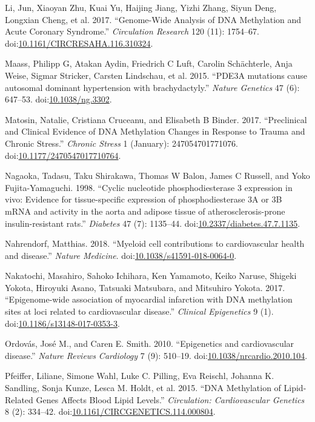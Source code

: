 \documentclass[]{article}
\theoremstyle{definition}
\theoremstyle{definition}
\theoremstyle{definition}
\theoremstyle{remark}
\begin{document}
Li, Jun, Xiaoyan Zhu, Kuai Yu, Haijing Jiang, Yizhi Zhang, Siyun Deng,
Longxian Cheng, et al. 2017. ``Genome-Wide Analysis of DNA Methylation
and Acute Coronary Syndrome.'' \emph{Circulation Research} 120 (11):
1754--67.
doi:\href{http://dx.doi.org/10.1161/CIRCRESAHA.116.310324}{10.1161/CIRCRESAHA.116.310324}.

Maass, Philipp G, Atakan Aydin, Friedrich C Luft, Carolin Sch{ä}chterle,
Anja Weise, Sigmar Stricker, Carsten Lindschau, et al. 2015. ``PDE3A
mutations cause autosomal dominant hypertension with brachydactyly.''
\emph{Nature Genetics} 47 (6): 647--53.
doi:\href{http://dx.doi.org/10.1038/ng.3302}{10.1038/ng.3302}.

Matosin, Natalie, Cristiana Cruceanu, and Elisabeth B Binder. 2017.
``Preclinical and Clinical Evidence of DNA Methylation Changes in
Response to Trauma and Chronic Stress.'' \emph{Chronic Stress} 1
(January): 247054701771076.
doi:\href{http://dx.doi.org/10.1177/2470547017710764}{10.1177/2470547017710764}.

Nagaoka, Tadasu, Taku Shirakawa, Thomas W Balon, James C Russell, and
Yoko Fujita-Yamaguchi. 1998. ``Cyclic nucleotide phosphodiesterase 3
expression in vivo: Evidence for tissue-specific expression of
phosphodiesterase 3A or 3B mRNA and activity in the aorta and adipose
tissue of atherosclerosis-prone insulin-resistant rats.''
\emph{Diabetes} 47 (7): 1135--44.
doi:\href{http://dx.doi.org/10.2337/diabetes.47.7.1135}{10.2337/diabetes.47.7.1135}.

Nahrendorf, Matthias. 2018. ``Myeloid cell contributions to
cardiovascular health and disease.'' \emph{Nature Medicine}.
doi:\href{http://dx.doi.org/10.1038/s41591-018-0064-0}{10.1038/s41591-018-0064-0}.

Nakatochi, Masahiro, Sahoko Ichihara, Ken Yamamoto, Keiko Naruse,
Shigeki Yokota, Hiroyuki Asano, Tatsuaki Matsubara, and Mitsuhiro
Yokota. 2017. ``Epigenome-wide association of myocardial infarction with
DNA methylation sites at loci related to cardiovascular disease.''
\emph{Clinical Epigenetics} 9 (1).
doi:\href{http://dx.doi.org/10.1186/s13148-017-0353-3}{10.1186/s13148-017-0353-3}.

Ordov{á}s, Jos{é} M., and Caren E. Smith. 2010. ``Epigenetics and
cardiovascular disease.'' \emph{Nature Reviews Cardiology} 7 (9):
510--19.
doi:\href{http://dx.doi.org/10.1038/nrcardio.2010.104}{10.1038/nrcardio.2010.104}.

Pfeiffer, Liliane, Simone Wahl, Luke C. Pilling, Eva Reischl, Johanna K.
Sandling, Sonja Kunze, Lesca M. Holdt, et al. 2015. ``DNA Methylation of
Lipid-Related Genes Affects Blood Lipid Levels.'' \emph{Circulation:
Cardiovascular Genetics} 8 (2): 334--42.
doi:\href{http://dx.doi.org/10.1161/CIRCGENETICS.114.000804}{10.1161/CIRCGENETICS.114.000804}.
\end{document}
